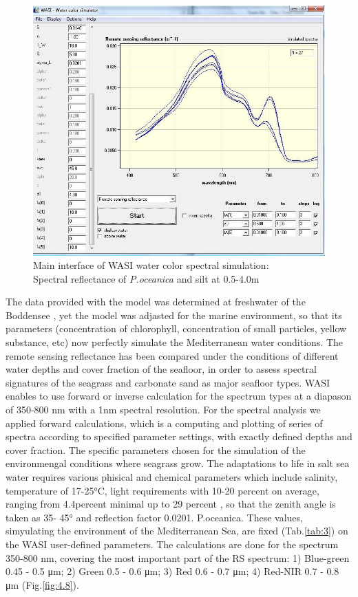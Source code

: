 \documentclass[10pt, a4paper]{article}
\begin{document}
\begin{figure}[h]
	\centering
	\includegraphics[scale=0.30]{Fig-30.jpg}
	\caption{Main interface of WASI water color spectral simulation: \\ Spectral reflectance of \textit{P.oceanica} and silt at 0.5-4.0m}
	\label{fig:4.7}
\end{figure}

The data provided with the model was determined at freshwater of the Boddensee \cite{Gege05}\label{Gege05}, 
yet the model was adjasted for the marine
environment, so that its parameters (concentration of chlorophyll, concentration of small particles,
yellow substance, etc) now perfectly simulate the Mediterranean water conditions.
The remote sensing reflectance has been compared under the conditions of different water depths and
cover fraction of the seafloor, in order to assess spectral signatures of the seagrass and carbonate sand
as major seafloor types. WASI enables to use forward or inverse calculation for the spectrum types at
a diapason of 350-800 nm with a 1nm spectral resolution. For the spectral analysis we applied
forward calculations, which is a computing and plotting of series of spectra according to specified
parameter settings, with exactly defined depths and cover fraction.
The specific parameters chosen for the simulation of the environmengal conditions where seagrass
grow. The adaptations to life in salt sea water requires various phisical and chemical parameters
which include salinity, temperature of 17-25°C, light requirements with 10-20 percent on average, ranging
from 4.4percent  minimal up to 29 percent \cite{McKenzie09}\label{McKenzie09}, so that the zenith angle is taken as 35-
45° and reflection factor 0.0201. P.oceanica. These values, simyulating the environment of the Mediterranean Sea, are fixed (Tab.\ref{tab:3}) on the WASI user-defined parameters.
The calculations are done for the spectrum 350-800 nm, covering the most important part of the RS spectrum: 1) Blue-green 0.45 - 0.5 μm; 2) Green 0.5 - 0.6 μm; 3) Red 0.6 - 0.7 μm; 4) Red-NIR 0.7 - 0.8 μm (Fig.\ref{fig:4.8}).
\end{document}
